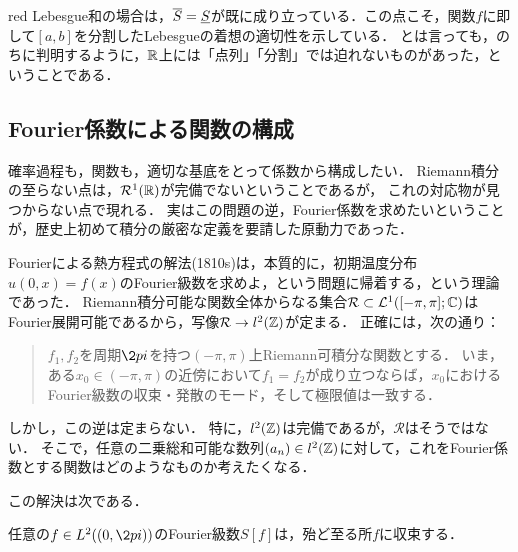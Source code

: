 \documentclass[uplatex, dvipdfmx]{jsreport}
\begin{document}
\begin{tbox}{red}{}
    Lebesgue和の場合は，$\overline{S}=\underline{S}$が既に成り立っている．この点こそ，関数$f$に即して$[a,b]$を分割したLebesgueの着想の適切性を示している．
    とは言っても，のちに判明するように，$\mathbb{R}$上には「点列」「分割」では迫れないものがあった，ということである．
\end{tbox}

\subsection{Fourier係数による関数の構成}

\begin{tcolorbox}[colframe=ForestGreen, colback=ForestGreen!10!white,breakable,colbacktitle=ForestGreen!40!white,coltitle=black,fonttitle=\bfseries\sffamily,
title=]
    確率過程も，関数も，適切な基底をとって係数から構成したい．
    Riemann積分の至らない点は，$\mathcal{R}^1(\mathbb{R})$が完備でないということであるが，
    これの対応物が見つからない点で現れる．
    実はこの問題の逆，Fourier係数を求めたいということが，歴史上初めて積分の厳密な定義を要請した原動力であった．
\end{tcolorbox}

\begin{question}[Fourier係数を指定して得る関数はどのような関数か？]
    Fourierによる熱方程式の解法(1810s)は，本質的に，初期温度分布$u(0,x)=f(x)$のFourier級数を求めよ，という問題に帰着する，という理論であった．
    Riemann積分可能な関数全体からなる集合$\mathcal{R}\subset\mathcal{L}^1([-\pi,\pi];\mathbb{C})$はFourier展開可能であるから，写像$\mathcal{R}\to l^2(\mathbb{Z})$が定まる．
    正確には，次の通り：
    \begin{quote}
        $f_1,f_2$を周期$\2pi$を持つ$(-\pi,\pi)$上Riemann可積分な関数とする．
        いま，ある$x_0\in(-\pi,\pi)$の近傍において$f_1=f_2$が成り立つならば，$x_0$におけるFourier級数の収束・発散のモード，そして極限値は一致する．\cite{藤田宏}
    \end{quote}
    しかし，この逆は定まらない．
    特に，$l^2(\mathbb{Z})$は完備であるが，$\mathcal{R}$はそうではない．
    そこで，任意の二乗総和可能な数列$(a_n)\in l^2(\mathbb{Z})$に対して，これをFourier係数とする関数はどのようなものか考えたくなる．
\end{question}

この解決は次である．

\begin{theorem}[Carleson, L. (1966)]
    任意の$f\in L^2((0,\2pi))$のFourier級数$S[f]$は，殆ど至る所$f$に収束する．
\end{theorem}
\end{document}
